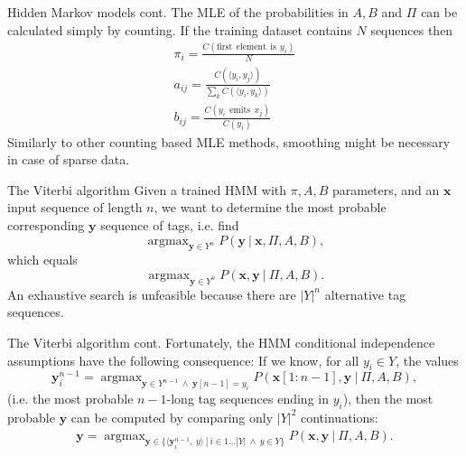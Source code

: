 \documentclass[style=upen, size=14pt]{powerdot}
\DeclareMathOperator*{\argmax}{argmax}
\theoremstyle{definition}
\begin{document}
  \begin{slide}[toc=]{Hidden Markov models cont.} The MLE of the probabilities
    in $A, B$ and $\Pi$ can be calculated simply by counting. If the training
    dataset contains $N$ sequences then
    \begin{gather*} \pi_i = \frac{C(\mathrm{first~~element~~is~~}
        y_i)}{N}\\ a_{ij} = \frac{C(\langle y_i,y_j\rangle)}{\sum_kC(\langle
        y_i,y_k\rangle)}\\ b_{ij} = \frac{C(y_i \mathrm{~~emits~~} x_j)}{C(y_i)}
    \end{gather*}
    Similarly to other counting based MLE methods, smoothing might be necessary
    in case of sparse data.
  \end{slide}

  \begin{slide}[toc=Viterbi]{The Viterbi algorithm}
    Given a trained HMM with $\pi, A, B$ parameters, and an $\mathbf{x}$
    input sequence of length $n$, we want to determine the most probable corresponding
    $\mathbf{y}$ sequence of tags, i.e. find
    $$
    \argmax_{\mathbf{y}\in Y^n} P(\mathbf{y} ~|~ \mathbf{x}, \Pi, A, B),
    $$
    which equals
    $$
    \argmax_{\mathbf{y}\in Y^n} P(\mathbf{x}, \mathbf{y} ~|~ \Pi, A, B).
    $$
    An exhaustive search is unfeasible because there are $|Y|^n$ alternative tag
    sequences.
  \end{slide}
  
  \begin{slide}[toc=]{The Viterbi algorithm cont.}
    Fortunately, the HMM conditional independence assumptions have the following
    consequence: If we know, for all $y_i\in Y$, the values
    $$
    \mathbf{y}^{n-1}_i = \argmax_{\mathbf{y}\in Y^{n-1}~\wedge~\mathbf{y}[n-1] = y_i}
    P(\mathbf{x}[1:n-1], \mathbf{y} ~|~ \Pi, A, B),
    $$
    (i.e. the most probable $n-1$-long tag sequences ending in $y_i$),
    then the most probable $\mathbf{y}$ can be computed by comparing only
    $|Y|^2$ continuations:
    \begin{gather*}
      \mathbf{y} = \argmax_{\mathbf{y}\in \{\langle \mathbf{y}_i^{n-1},~y \rangle ~|~ i \in 1\dots |Y|~\wedge~ y \in Y\}} P(\mathbf{x}, \mathbf{y} ~|~ \Pi, A, B).
    \end{gather*}
  \end{slide}
\end{document}

